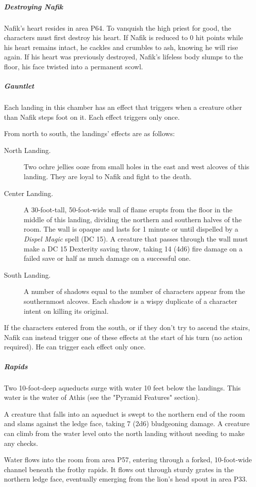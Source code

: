 \documentclass[10pt,a4paper,twoside,bg=print,twocolumn,openany,nodeprecatedcode]{dndbook}
\begin{document}
\subparagraph{Destroying Nafik}
Nafik's heart resides in area P64. To vanquish the high priest for good, the characters must first destroy his heart. If Nafik is reduced to 0 hit points while his heart remains intact, he cackles and crumbles to ash, knowing he will rise again. If his heart was previously destroyed, Nafik's lifeless body slumps to the floor, his face twisted into a permanent scowl.

\subparagraph{Gauntlet}
Each landing in this chamber has an effect that triggers when a creature other than Nafik steps foot on it. Each effect triggers only once.

From north to south, the landings' effects are as follows:


\begin{description}
\item[North Landing.]
Two ochre jellies ooze from small holes in the east and west alcoves of this landing. They are loyal to Nafik and fight to the death.
\item[Center Landing.]
A 30-foot-tall, 50-foot-wide wall of flame erupts from the floor in the middle of this landing, dividing the northern and southern halves of the room. The wall is opaque and lasts for 1 minute or until dispelled by a \textit{Dispel Magic} spell (DC 15). A creature that passes through the wall must make a DC 15 Dexterity saving throw, taking 14 (4d6) fire damage on a failed save or half as much damage on a successful one.
\item[South Landing.]
A number of shadows equal to the number of characters appear from the southernmost alcoves. Each shadow is a wispy duplicate of a character intent on killing its original.
\end{description}

If the characters entered from the south, or if they don't try to ascend the stairs, Nafik can instead trigger one of these effects at the start of his turn (no action required). He can trigger each effect only once.

\subparagraph{Rapids}
Two 10-foot-deep aqueducts surge with water 10 feet below the landings. This water is the water of Athis (see the "Pyramid Features" section).

A creature that falls into an aqueduct is swept to the northern end of the room and slams against the ledge face, taking 7 (2d6) bludgeoning damage. A creature can climb from the water level onto the north landing without needing to make any checks.

Water flows into the room from area P57, entering through a forked, 10-foot-wide channel beneath the frothy rapids. It flows out through sturdy grates in the northern ledge face, eventually emerging from the lion's head spout in area P33.
\end{document}
